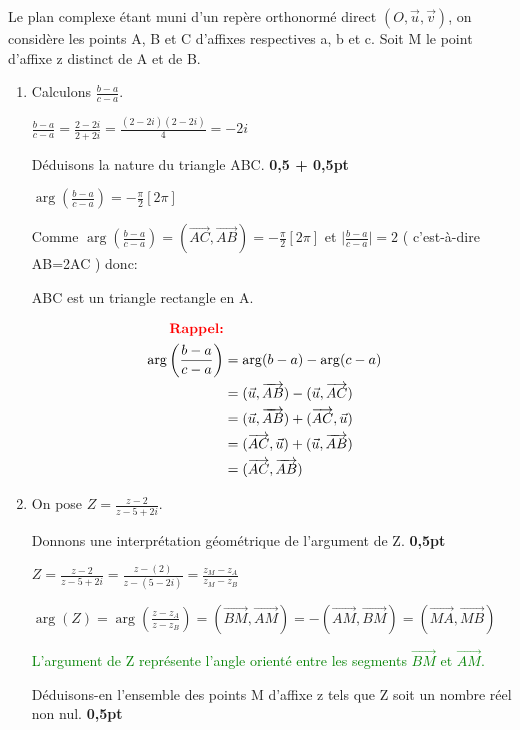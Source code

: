 \documentclass[12pt]{article}
\begin{document}
\begin{enumerate}
			Le plan complexe étant muni d’un repère orthonormé direct $( O, \vec{u} ,\vec{v} )$, on considère les points A, B et C d’affixes respectives a, b et c. Soit M le point d’affixe z distinct de A et de B.
	\begin{enumerate}
		\item Calculons $\frac{b-a}{c-a}$.
		
		$\frac{b-a}{c-a}=\frac{2 - 2i}{2 + 2i}=\frac{(2 - 2i)(2 - 2i)}{4}=-2i$
		
		Déduisons la nature du triangle ABC. \textbf{ 0,5 + 0,5pt}
		
		$\arg\left( \frac{b-a}{c-a} \right) =-\frac{\pi}{2}[2\pi] $
		
		Comme $\arg\left( \frac{b-a}{c-a} \right) =(\overrightarrow{AC},\overrightarrow{AB})=-\frac{\pi}{2}[2\pi] $ et $\mid\frac{b-a}{c-a}\mid=2$ ( c'est-à-dire AB=2AC ) donc:
		
		ABC est un triangle rectangle en A.
		
		\begin{align*}\textbf{\textcolor{red}{Rappel:}}\\
				\arg\left( \frac{b-a}{c-a} \right) &=\arg(b-a)-\arg(c-a)\\
				&=(\vec{u},\overrightarrow{AB})-(\vec{u},\overrightarrow{AC})\\
				&=(\vec{u},\overrightarrow{AB})+(\overrightarrow{AC},\vec{u})\\
				&=(\overrightarrow{AC},\vec{u})+(\vec{u},\overrightarrow{AB})\\
				&=(\overrightarrow{AC},\overrightarrow{AB})
		\end{align*}

		
		\item On pose $Z=\frac{z-2}{z-5+2i}.$
		
		Donnons une interprétation géométrique de l’argument de Z.\textbf{ 0,5pt}
		
		$Z=\frac{z-2}{z-5+2i}=\frac{z-(2)}{z-(5-2i)}=\frac{z_{M}-z_{A}}{z_{M}-z_{B}}$
		
		$ \arg(Z)=\arg(\frac{z-z_{A}}{z-z_{B}})=(\overrightarrow{BM},\overrightarrow{AM})=-(\overrightarrow{AM},\overrightarrow{BM})=(\overrightarrow{MA},\overrightarrow{MB})$
		
		\textcolor{green}{L'argument de Z représente l'angle orienté entre les segments $\overrightarrow{BM}$ et $\overrightarrow{AM}$.}
		
		Déduisons-en l’ensemble des points M d’affixe z tels que Z soit un nombre réel non nul.\textbf{ 0,5pt}
		

\end{enumerate}
\end{enumerate}
\end{document}
